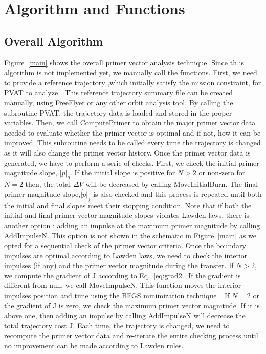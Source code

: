 \documentclass[12pt]{report}
\begin{document}
\section{Algorithm and Functions}
\subsection{Overall Algorithm}
Figure~\ref{main} shows the overall primer vector analysis
technique. Since th is algorithm is \underline{not} implemented
yet, we manually call the functions. First, we need to provide a
reference trajectory ,which initially satisfy the mission
constraint, for PVAT to analyze . This reference trajectory
summary file can be created manually, using FreeFlyer or any other
orbit analysis tool. By calling the subroutine PVAT, the
trajectory data is loaded and stored in the proper variables.
Then, we call ComputePrimer to obtain the major primer vector data
needed to evaluate whether the primer vector is optimal and if
not, how it can be improved. This subroutine needs to be called
every time the trajectory is changed as it will also change the
primer vector history. Once the primer vector data is generated,
we have to perform a serie of checks. First, we check the initial
primer magnitude slope, $\dot{|p|}_{o}$. If the initial slope is
positive for $N>2$ or non-zero for $N=2$ then, the total $\Delta
V$ will be decreased by calling MoveInitialBurn. The final primer
magnitude slope,$\dot{|p|}_{f}$ is also checked and this process
is repeated until both the initial \underline{and} final slopes
meet their stopping condition. Note that if both the initial and
final primer vector magnitude slopes violates Lawden laws, there
is another option : adding an impulse at the maximum primer
magnitude by calling AddImpulseN. This option is not shown in the
schematic in Figure~\ref{main} as we opted for a sequential check
of the primer vector criteria. Once the boundary impulses are
optimal according to Lawden laws, we need to check the interior
impulses (if any) and the primer vector magnitude during the
transfer. If $N>2$, we compute the gradient of J according to
Eq.~\ref{eq:grad2}. If the gradient is different from null, we
call MoveImpulseN. This function moves the interior impulses
position and time using the BFGS minimization
technique~\cite{Rao96}. If $N=2$ or the gradient of J is zero, we
check the maximum primer vector magnitude. If it is above one,
then adding an impulse by calling AddImpulseN will decrease the
total trajectory cost J. Each time, the trajectory is changed, we
need to recompute the primer vector data and re-iterate the entire
checking process until no improvement can be made according to
Lawden rules.
\end{document}
